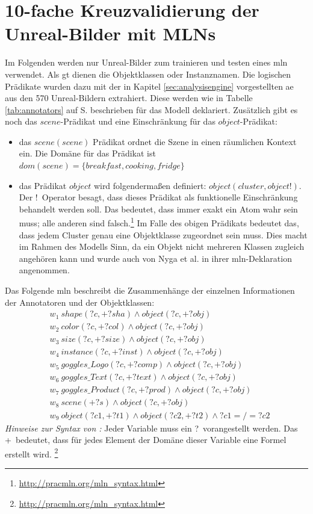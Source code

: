 \section{10-fache Kreuzvalidierung der Unreal-Bilder mit MLNs}
\label{sec:onlyUnrealImages}
Im Folgenden werden nur Unreal-Bilder zum trainieren und testen eines \gls{mln} verwendet. Als \gls{gt} dienen die Objektklassen oder Instanznamen. Die logischen Prädikate wurden dazu mit der in Kapitel \ref{sec:analysisengine} vorgestellten \gls{ae} aus den 570 Unreal-Bildern extrahiert. Diese werden wie in Tabelle \ref{tab:annotators} auf S.\pageref{tab:annotators} beschrieben für das Modell deklariert.  Zusätzlich gibt es noch das $scene$-Prädikat und eine Einschränkung für das $object$-Prädikat:
\begin{itemize}
\item das $scene(scene)$ Prädikat ordnet die Szene in einen räumlichen Kontext ein. Die Domäne für das Prädikat ist $dom(scene) = \{breakfast, cooking, fridge\}$
\item das Prädikat $object$ wird folgendermaßen definiert: $object(cluster, object!)$. Der \glqq!\grqq \ Operator besagt, dass dieses Prädikat als funktionelle Einschränkung behandelt werden soll. Das bedeutet, dass immer exakt ein Atom wahr sein muss; alle anderen sind falsch.\footnote{\url{http://pracmln.org/mln_syntax.html}} Im Falle des obigen Prädikats bedeutet das, dass jedem Cluster genau eine Objektklasse zugeordnet sein muss. Dies macht im Rahmen des Modells Sinn, da ein Objekt nicht mehreren Klassen zugleich angehören kann und wurde auch von Nyga et al.\cite{pr2looking} in ihrer \gls{mln}-Deklaration angenommen.
\end{itemize}
Das Folgende \gls{mln} beschreibt die Zusammenhänge der einzelnen Informationen der Annotatoren und der Objektklassen:
\begin{align*}
& w_{1} \ shape(?c, +?sha) \wedge object(?c, +?obj) \\
& w_{2} \ color(?c, +?col) \wedge object(?c, +?obj) \\
& w_{3} \ size(?c, +?size) \wedge object(?c, +?obj) \\
& w_{4} \ instance(?c, +?inst) \wedge object(?c, +?obj) \\
& w_{5} \ goggles\_Logo(?c, +?comp) \wedge object(?c, +?obj)\\
& w_{6} \ goggles\_Text(?c, +?text) \wedge object(?c, +?obj)\\
& w_{7} \ goggles\_Product(?c, +?prod) \wedge object(?c, +?obj)\\
& w_{8} \ scene(+?s) \wedge object(?c, +?obj)\\
& w_{9} \ object(?c1, +?t1) \wedge object(?c2, +?t2) \wedge ?c1 =/= ?c2
\end{align*}
\textit{Hinweise zur Syntax von \pracmln:} Jeder Variable muss ein \glqq ?\grqq \ vorangestellt werden. Das \glqq +\grqq \ bedeutet, dass für jedes Element der Domäne dieser Variable eine Formel erstellt wird. \footnote{\url{http://pracmln.org/mln_syntax.html}}  \par
 
